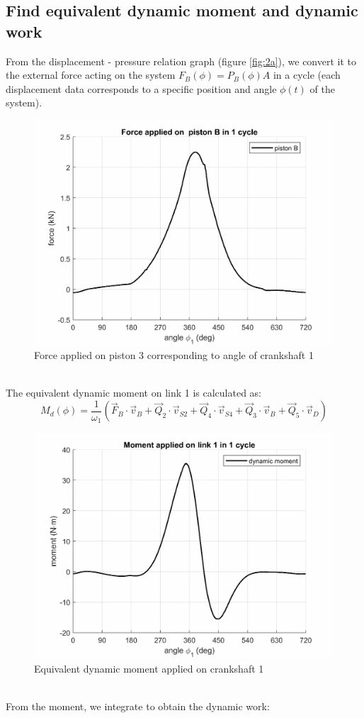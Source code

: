 \subsection{Find equivalent dynamic moment and dynamic work}
From the displacement - pressure relation graph (figure \ref{fig:2a}), we convert it to the external force acting on the system $ F_B(\phi)=P_B(\phi) A $ in a cycle (each displacement data corresponds to a specific position and angle $ \phi(t) $ of the system).
\begin{figure}[h]
	\centering
	\includegraphics[width=0.6\linewidth]{11}
	\caption{Force applied on piston 3 corresponding to angle of crankshaft 1}
	\label{fig:11}
\end{figure}\\
The equivalent dynamic moment on link 1 is calculated as:
\begin{equation}
	M_d(\phi)=\dfrac{1}{\omega_1}\left(\vec{F}_B\cdot\vec{v}_B+\vec{Q}_2\cdot\vec{v}_{S2}+\vec{Q}_4\cdot\vec{v}_{S4}+\vec{Q}_3\cdot\vec{v}_{B}+\vec{Q}_5\cdot\vec{v}_{D}\right)
\end{equation}
\begin{figure}[h]
	\centering
	\includegraphics[width=0.6\linewidth]{13}
	\caption{Equivalent dynamic moment applied on crankshaft 1}
	\label{fig:13}
\end{figure}\\
From the moment, we integrate to obtain the dynamic work:
